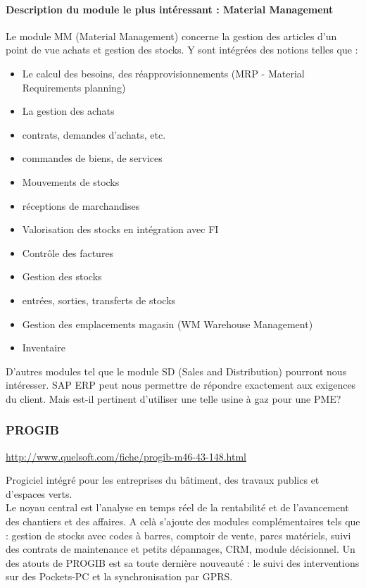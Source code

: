 \paragraph{Description du module le plus intéressant : Material Management}
Le module MM (Material Management) concerne la gestion des articles d'un point de vue achats et gestion des stocks.
Y sont intégrées des notions telles que :
\begin{itemize}
\item Le calcul des besoins, des réapprovisionnements (MRP - Material Requirements planning)
\item La gestion des achats
\item contrats, demandes d'achats, etc.
\item commandes de biens, de services
\item Mouvements de stocks
\item réceptions de marchandises
\item Valorisation des stocks en intégration avec FI
\item Contrôle des factures
\item Gestion des stocks
\item entrées, sorties, transferts de stocks
\item Gestion des emplacements magasin (WM Warehouse Management)
\item Inventaire\\
\end{itemize}

D'autres modules tel que le module SD (Sales and Distribution) pourront nous intéresser.
SAP ERP peut nous permettre de répondre exactement aux exigences du client. Mais est-il pertinent d'utiliser une telle usine à gaz pour une PME?  

		\subsubsection{PROGIB}
				\url{http://www.quelsoft.com/fiche/progib-m46-43-148.html}
				 
				Progiciel intégré pour les entreprises du bâtiment, des travaux publics et d'espaces verts.\\

Le noyau central est l'analyse en temps réel de la rentabilité et de l'avancement des chantiers et des affaires. A celà s'ajoute des modules complémentaires tels que
 : gestion de stocks avec codes à barres, comptoir de vente, parcs matériels, suivi des contrats de maintenance et petits dépannages, CRM, module décisionnel.
Un des atouts de PROGIB est sa toute dernière nouveauté : le suivi des interventions sur des Pockets-PC et la synchronisation par GPRS.

